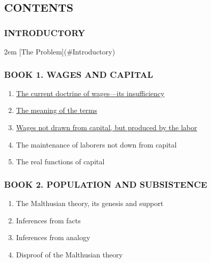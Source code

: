\renewcommand{\labelenumi}{\Roman{enumi}.}

\hypertarget{contents}{%
\subsection{CONTENTS}\label{contents}}

\hypertarget{introductory}{%
\subsubsection{INTRODUCTORY}\label{introductory}}

\begin{adjustwidth}{2em}{}
[The Problem](#Introductory)
\end{adjustwidth}

\hypertarget{book-1.-wages-and-capital}{%
\subsubsection{BOOK 1. WAGES AND
CAPITAL}\label{book-1.-wages-and-capital}}

\begin{enumerate}
\def\labelenumi{\arabic{enumi}.}
\tightlist
\item
  \protect\hyperlink{Book1Chapter1}{The current doctrine of wages---its
  insufficiency}
\item
  \protect\hyperlink{Book1Chapter2}{The meaning of the terms}
\item
  \protect\hyperlink{Book1Chapter3}{Wages not drawn from capital, but
  produced by the labor}
\item
  The maintenance of laborers not down from capital
\item
  The real functions of capital
\end{enumerate}

\hypertarget{book-2.-population-and-subsistence}{%
\subsubsection{BOOK 2. POPULATION AND
SUBSISTENCE}\label{book-2.-population-and-subsistence}}

\begin{enumerate}
\def\labelenumi{\arabic{enumi}.}
\tightlist
\item
  The Malthusian theory, its genesis and support
\item
  Inferences from facts
\item
  Inferences from analogy
\item
  Disproof of the Malthusian theory
\end{enumerate}

